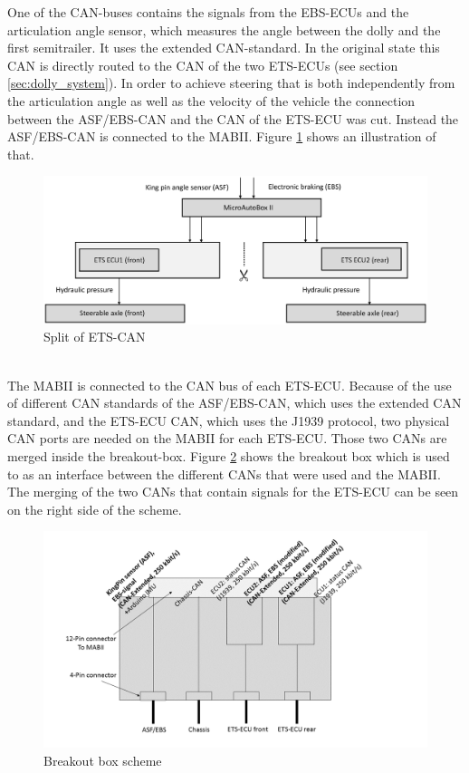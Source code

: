 \documentclass[ExampleMasters.tex]{subfiles}
\begin{document}
One of the CAN-buses contains the signals from the EBS-ECUs and the articulation angle sensor, which measures the angle between the dolly and the first semitrailer. It uses the extended CAN-standard. In the original state this CAN is directly routed to the CAN of the two ETS-ECUs (see section \ref{sec:dolly_system}). In order to achieve steering that is both independently from the articulation angle as well as the velocity of the vehicle the connection between the ASF/EBS-CAN and the CAN of the ETS-ECU was cut. Instead the ASF/EBS-CAN is connected to the MABII. Figure \ref{fig:dolly_split} shows an illustration of that.
\begin{figure}[h]
	\centering
	\includegraphics[width=1\linewidth]{figures/dolly_split}
	\caption{Split of ETS-CAN}
	\label{fig:dolly_split}
\end{figure}  \\

The MABII is connected to the CAN bus of each ETS-ECU. Because of the use of different CAN standards of the ASF/EBS-CAN, which uses the extended CAN standard, and the ETS-ECU CAN, which uses the J1939 protocol, two physical CAN ports are needed on the MABII for each ETS-ECU. Those two CANs are merged inside the breakout-box. Figure \ref{fig:BOB} shows the breakout box which is used to as an interface between the different CANs that were used and the MABII. The merging of the two CANs that contain signals for the ETS-ECU can be seen on the right side of the scheme.
\begin{figure}[h]
	\centering
	\includegraphics[width=1\linewidth]{figures/BOB_schema}
	\caption{Breakout box scheme}
	\label{fig:BOB}
\end{figure}
\end{document}
